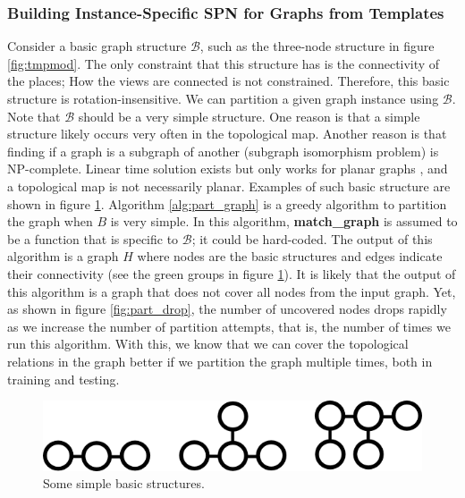 \documentclass[10pt, titlepage]{article}
\theoremstyle{definition}
\begin{document}
\subsubsection{Building Instance-Specific SPN for Graphs from Templates}
Consider a basic graph structure $\mathcal{B}$, such as the three-node structure in figure \ref{fig:tmpmod}. The only constraint that this structure has is the connectivity of the places; How the views are connected is not constrained. Therefore, this basic structure is rotation-insensitive. We can partition a given graph instance using $\mathcal{B}$. Note that $\mathcal{B}$ should be a very simple structure. One reason is that a simple structure likely occurs very often in the topological map. Another reason is that finding if a graph is a subgraph of another (subgraph isomorphism problem) is NP-complete. Linear time solution exists but only works for planar graphs \cite{eppstein1995subgraph}, and a topological map is not necessarily planar. Examples of such basic structure are shown in figure \ref{fig:basic_struct}. Algorithm \ref{alg:part_graph} is a greedy algorithm to partition the graph when $B$ is very simple. In this algorithm, \textbf{match\_graph} is assumed to be a function that is specific to $\mathcal{B}$; it could be hard-coded. The output of this algorithm is a graph $H$ where nodes are the basic structures and edges indicate their connectivity (see the green groups in figure \ref{fig:basic_struct}). It is likely that the output of this algorithm is a graph that does not cover all nodes from the input graph. Yet, as shown in figure \ref{fig:part_drop}, the number of uncovered nodes drops rapidly as we increase the number of partition attempts, that is, the number of times we run this algorithm. With this, we know that we can cover the topological relations in the graph better if we partition the graph multiple times, both in training and testing.

\begin{figure}[!htb]
    \centering
    \captionsetup{width=.8\linewidth}
    \includegraphics[scale=0.5]{images/example_basics.png}
    \caption{Some simple basic structures.}
    \label{fig:basic_struct}
\end{figure}
\end{document}
